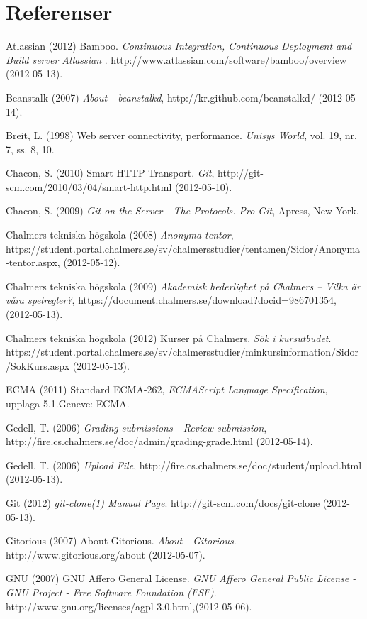 
\renewcommand{\thechapter}{}
\chapter{Referenser}
\begin{flushleft}
\small
Atlassian (2012) Bamboo. \emph{Continuous Integration, Continuous Deployment and Build server Atlassian  }. http://www.atlassian.com/software/bamboo/overview (2012-05-13).

Beanstalk (2007) \emph{About - beanstalkd}, http://kr.github.com/beanstalkd/ (2012-05-14).

Breit, L. (1998) Web server connectivity, performance. \emph{Unisys World}, vol. 19, nr. 7, ss. 8, 10.

Chacon, S. (2010) Smart HTTP Transport. \emph{Git}, http://git-scm.com/2010/03/04/smart-http.html (2012-05-10).

Chacon, S. (2009) \emph{Git on the Server - The Protocols. Pro Git}, Apress, New York.

Chalmers tekniska högskola (2008) \emph{Anonyma tentor}, https://student.portal.chalmers.se/sv/chalmersstudier/tentamen/Sidor/Anonyma-tentor.aspx, (2012-05-12).

Chalmers tekniska högskola (2009) \emph{Akademisk hederlighet på Chalmers – Vilka är våra spelregler?}, https://document.chalmers.se/download?docid=986701354, (2012-05-13).

Chalmers tekniska högskola (2012) Kurser på Chalmers. \emph{Sök i kursutbudet}. https://student.portal.chalmers.se/sv/chalmersstudier/minkursinformation/Sidor/SokKurs.aspx (2012-05-13).

ECMA (2011) Standard ECMA-262, \emph{ECMAScript Language Specification}, upplaga 5.1.Geneve: ECMA.

Gedell, T. (2006) \emph{Grading submissions - Review submission}, http://fire.cs.chalmers.se/doc/admin/grading-grade.html (2012-05-14).

Gedell, T. (2006) \emph{Upload File}, http://fire.cs.chalmers.se/doc/student/upload.html (2012-05-13).

Git (2012) \emph{git-clone(1) Manual Page}. http://git-scm.com/docs/git-clone (2012-05-13).

Gitorious (2007) About Gitorious. \emph{ About - Gitorious}. http://www.gitorious.org/about (2012-05-07).

GNU (2007) GNU Affero General License. \emph{GNU Affero General Public License - GNU Project - Free Software Foundation (FSF)}. http://www.gnu.org/licenses/agpl-3.0.html,(2012-05-06).


\end{flushleft}
